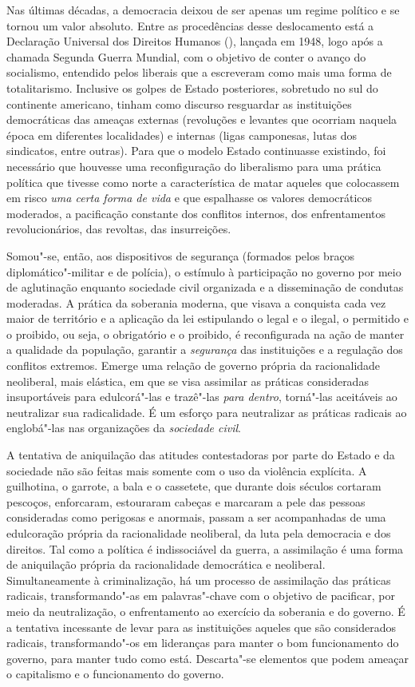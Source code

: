 Nas últimas décadas, a democracia deixou de ser apenas um regime
político e se tornou um valor absoluto. Entre as procedências desse
deslocamento está a Declaração Universal dos Direitos Humanos (),
lançada em 1948, logo após a chamada Segunda Guerra Mundial, com o
objetivo de conter o avanço do socialismo, entendido pelos liberais que
a escreveram como mais uma forma de totalitarismo. Inclusive os golpes
de Estado posteriores, sobretudo no sul do continente americano, tinham
como discurso resguardar as instituições democráticas das ameaças
externas (revoluções e levantes que ocorriam naquela época em diferentes
localidades) e internas (ligas camponesas, lutas dos sindicatos, entre
outras). Para que o modelo Estado continuasse existindo, foi necessário
que houvesse uma reconfiguração do liberalismo para uma prática política
que tivesse como norte a característica de matar aqueles que colocassem
em risco \emph{uma certa forma de vida} e que espalhasse os valores
democráticos moderados, a pacificação constante dos conflitos internos,
dos enfrentamentos revolucionários, das revoltas, das insurreições.

Somou"-se, então, aos dispositivos de segurança (formados pelos braços
diplomático"-militar e de polícia), o estímulo à participação no governo
por meio de aglutinação enquanto sociedade civil organizada e a
disseminação de condutas moderadas. A prática da soberania moderna, que
visava a conquista cada vez maior de território e a aplicação da lei
estipulando o legal e o ilegal, o permitido e o proibido, ou seja, o
obrigatório e o proibido, é reconfigurada na ação de manter a qualidade
da população, garantir a \emph{segurança} das instituições e a regulação
dos conflitos extremos. Emerge uma relação de governo própria da
racionalidade neoliberal, mais elástica, em que se visa assimilar as
práticas consideradas insuportáveis para edulcorá"-las e trazê"-las
\emph{para dentro}, torná"-las aceitáveis ao neutralizar sua
radicalidade. É um esforço para neutralizar as práticas radicais ao
englobá"-las nas organizações da \emph{sociedade civil}.

A tentativa de aniquilação das atitudes contestadoras por parte do
Estado e da sociedade não são feitas mais somente com o uso da violência
explícita. A guilhotina, o garrote, a bala e o cassetete, que durante
dois séculos cortaram pescoços, enforcaram, estouraram cabeças e
marcaram a pele das pessoas consideradas como perigosas e anormais,
passam a ser acompanhadas de uma edulcoração própria da racionalidade
neoliberal, da luta pela democracia e dos direitos. Tal como a política
é indissociável da guerra, a assimilação é uma forma de aniquilação
própria da racionalidade democrática e neoliberal. Simultaneamente à
criminalização, há um processo de assimilação das práticas radicais,
transformando"-as em palavras"-chave com o objetivo de pacificar, por meio
da neutralização, o enfrentamento ao exercício da soberania e do
governo. É a tentativa incessante de levar para as instituições aqueles
que são considerados radicais, transformando"-os em lideranças para
manter o bom funcionamento do governo, para manter tudo como está.
Descarta"-se elementos que podem ameaçar o capitalismo e o funcionamento
do governo.

